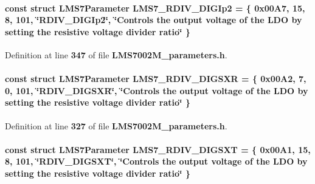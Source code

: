 \paragraph[{L\+M\+S7\+\_\+\+R\+D\+I\+V\+\_\+\+D\+I\+G\+Ip2}]{\setlength{\rightskip}{0pt plus 5cm}const struct {\bf L\+M\+S7\+Parameter} L\+M\+S7\+\_\+\+R\+D\+I\+V\+\_\+\+D\+I\+G\+Ip2 = \{ 0x00\+A7, 15, 8, 101, \char`\"{}\+R\+D\+I\+V\+\_\+\+D\+I\+G\+Ip2\char`\"{}, \char`\"{}\+Controls the output voltage of the L\+D\+O by setting the resistive voltage divider ratio\char`\"{} \}\hspace{0.3cm}{\ttfamily [static]}}\label{LMS7002M__parameters_8h_a5bd69203a87961184c52a36b9540a7fb}


Definition at line {\bf 347} of file {\bf L\+M\+S7002\+M\+\_\+parameters.\+h}.

\paragraph[{L\+M\+S7\+\_\+\+R\+D\+I\+V\+\_\+\+D\+I\+G\+S\+XR}]{\setlength{\rightskip}{0pt plus 5cm}const struct {\bf L\+M\+S7\+Parameter} L\+M\+S7\+\_\+\+R\+D\+I\+V\+\_\+\+D\+I\+G\+S\+XR = \{ 0x00\+A2, 7, 0, 101, \char`\"{}\+R\+D\+I\+V\+\_\+\+D\+I\+G\+S\+X\+R\char`\"{}, \char`\"{}\+Controls the output voltage of the L\+D\+O by setting the resistive voltage divider ratio\char`\"{} \}\hspace{0.3cm}{\ttfamily [static]}}\label{LMS7002M__parameters_8h_aa1e02711cf3505009bc0321f37456fc1}


Definition at line {\bf 327} of file {\bf L\+M\+S7002\+M\+\_\+parameters.\+h}.

\paragraph[{L\+M\+S7\+\_\+\+R\+D\+I\+V\+\_\+\+D\+I\+G\+S\+XT}]{\setlength{\rightskip}{0pt plus 5cm}const struct {\bf L\+M\+S7\+Parameter} L\+M\+S7\+\_\+\+R\+D\+I\+V\+\_\+\+D\+I\+G\+S\+XT = \{ 0x00\+A1, 15, 8, 101, \char`\"{}\+R\+D\+I\+V\+\_\+\+D\+I\+G\+S\+X\+T\char`\"{}, \char`\"{}\+Controls the output voltage of the L\+D\+O by setting the resistive voltage divider ratio\char`\"{} \}\hspace{0.3cm}{\ttfamily [static]}}\label{LMS7002M__parameters_8h_a6d1ef7aa37f3f589eac5322a8665427a}



